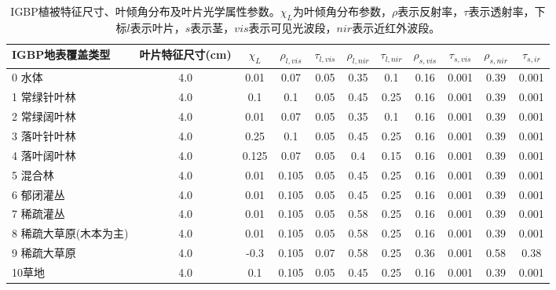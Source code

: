 \begin{sidewaystable}[]
    \centering
    \caption{IGBP植被特征尺寸、叶倾角分布及叶片光学属性参数。$\chi_L$为叶倾角分布参数，$\rho$表示反射率，$\tau$表示透射率，下标$l$表示叶片，$s$表示茎，$vis$表示可见光波段，$nir$表示近红外波段。}
    \label{tab:IGBP植被特征尺寸叶倾角分布及叶片光学属性参数1}
        \begin{tabular}{@{}lcccccccccc@{}}
        \toprule
        IGBP地表覆盖类型     & 叶片特征尺寸(cm) & $\chi_L$ &$\rho_{l, vis}$ & $\tau_{l, v i s}$  &$\rho_{l,  nir}$ &$\tau_{l,  nir}$ & $\rho_{s, v i s}$ &$\tau_{s, v i s}$ &$\rho_{s,  nir}$ &$\tau_{s,ir}$\\ \midrule
        0 水体          & 4.0        & 0.01  & 0.07  & 0.05 & 0.35 & 0.1  & 0.16 & 0.001 & 0.39 & 0.001 \\
        1 常绿针叶林       & 4.0        & 0.1   & 0.1   & 0.05 & 0.45 & 0.25 & 0.16 & 0.001 & 0.39 & 0.001 \\
        2 常绿阔叶林       & 4.0        & 0.01  & 0.07  & 0.05 & 0.35 & 0.1  & 0.16 & 0.001 & 0.39 & 0.001 \\
        3 落叶针叶林       & 4.0        & 0.25  & 0.1   & 0.05 & 0.45 & 0.25 & 0.16 & 0.001 & 0.39 & 0.001 \\
        4 落叶阔叶林       & 4.0        & 0.125 & 0.07  & 0.05 & 0.4  & 0.15 & 0.16 & 0.001 & 0.39 & 0.001 \\
        5 混合林         & 4.0        & 0.01  & 0.105 & 0.05 & 0.45 & 0.25 & 0.16 & 0.001 & 0.39 & 0.001 \\
        6 郁闭灌丛        & 4.0        & 0.01  & 0.105 & 0.05 & 0.45 & 0.25 & 0.16 & 0.001 & 0.39 & 0.001 \\
        7 稀疏灌丛        & 4.0        & 0.01  & 0.105 & 0.05 & 0.58 & 0.25 & 0.16 & 0.001 & 0.39 & 0.001 \\
        8 稀疏大草原(木本为主) & 4.0        & 0.01  & 0.105 & 0.05 & 0.58 & 0.25 & 0.16 & 0.001 & 0.39 & 0.001 \\
        9 稀疏大草原       & 4.0        & -0.3  & 0.105 & 0.07 & 0.58 & 0.25 & 0.36 & 0.001 & 0.58 & 0.38  \\
        10草地          & 4.0        & 0.1   & 0.105 & 0.05 & 0.45 & 0.25 & 0.16 & 0.001 & 0.39 & 0.001 \\\bottomrule
        \end{tabular}
    \end{sidewaystable}
 

